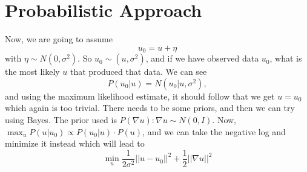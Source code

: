 \documentclass[11pt]{article}
\begin{document}
\section{Probabilistic Approach}
Now, we are going to assume
\begin{equation}
        u_0 = u + \eta 
\end{equation}
with $\eta \sim N(0, \sigma^2)$.
So $u_0 \sim (u,\sigma^2)$, and if we have observed data $u_0$, what is the most likely $u$ that produced that data.
We can see
\begin{equation}
    P(u_0|u) = N(u_0| u, \sigma^2),
\end{equation}
and using the maximum likelihood estimate, it should follow that we get $u = u_0$ which again is too trivial.
There needs to be some priors, and then we can try using Bayes.
The prior used is $P(\nabla u): \nabla u \sim N(0, I)$.
Now, $\max_u P(u| u_0) \propto P(u_0|u) \cdot P(u)$, and we can take the negative log and minimize it instead which will lead to
\begin{equation}
    \min_u \frac{1}{2\sigma^2}||u - u_0||^2 + \frac{1}{2}||\nabla u||^2
\end{equation}
\end{document}
